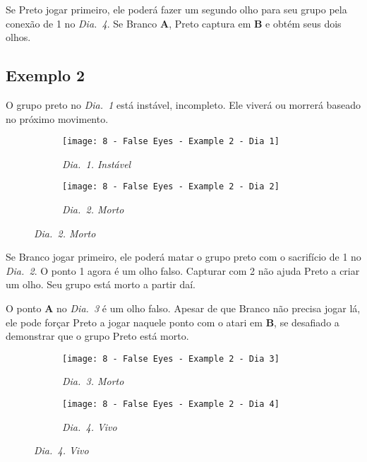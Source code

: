 Se Preto jogar primeiro, ele poderá fazer um segundo olho para seu grupo pela conexão de 1 no \emph{Dia.\@~4}. Se Branco \textbf{A}, Preto captura em \textbf{B} e obtém seus dois olhos.

\pagebreak

\subsection{Exemplo 2}

O grupo preto no \emph{Dia.\@~1} está instável, incompleto. Ele viverá ou morrerá baseado no próximo movimento.

\begin{figure}[h!]
    \centering
    \begin{subfigure}[t]{.31\textwidth}
        \texttt{[image: 8 - False Eyes - Example 2 - Dia 1]}
        \captionsetup{justification=centering}
        \caption*{\emph{Dia.\@~1. Instável}}
    \end{subfigure}
    \hspace{1cm}
    \begin{subfigure}[t]{.31\textwidth}
        \texttt{[image: 8 - False Eyes - Example 2 - Dia 2]}
        \captionsetup{justification=centering}
        \caption*{\emph{Dia.\@~2. Morto}}
    \end{subfigure}
\end{figure}

Se Branco jogar primeiro, ele poderá matar o grupo preto com o sacrifício de 1 no \emph{Dia.\@~2}. O ponto 1 agora é um olho falso. Capturar com 2 não ajuda Preto a criar um olho. Seu grupo está morto a partir daí.

O ponto \textbf{A} no \emph{Dia.\@~3} é um olho falso. Apesar de que Branco não precisa jogar lá, ele pode forçar Preto a jogar naquele ponto com o atari em \textbf{B}, se desafiado a demonstrar que o grupo Preto está morto.

\begin{figure}[h!]
    \centering
    \begin{subfigure}[t]{.31\textwidth}
        \texttt{[image: 8 - False Eyes - Example 2 - Dia 3]}
        \captionsetup{justification=centering}
        \caption*{\emph{Dia.\@~3. Morto}}
    \end{subfigure}
    \hspace{1cm}
    \begin{subfigure}[t]{.31\textwidth}
        \texttt{[image: 8 - False Eyes - Example 2 - Dia 4]}
        \captionsetup{justification=centering}
        \caption*{\emph{Dia.\@~4. Vivo}}
    \end{subfigure}
\end{figure}

